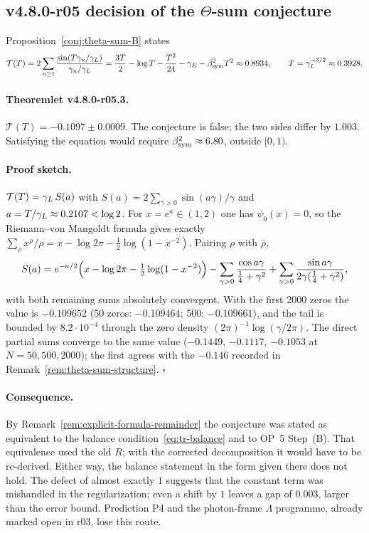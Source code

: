 \subsection*{v4.8.0-r05 decision of the \texorpdfstring{$\Theta$}{Theta}-sum conjecture}
\label{subsec:v480-r05-theta-sum-decision}

Proposition~\ref{conj:theta-sum-B} states
\[
\mathcal T(T)=2\sum_{n\ge1}\frac{\sin(T\gamma_n/\gamma_L)}{\gamma_n/\gamma_L}
=\frac{3T}{2}-\log T-\frac{T^2}{24}-\gamma_E-\beta_{\mathrm{sym}}^2T^2\approx0.8934,
\qquad T=\gamma_L^{-3/2}\approx0.3928 .
\]

\paragraph{Theoremlet v4.8.0-r05.3.}
\(\mathcal T(T)=-0.1097\pm0.0009\).  The conjecture is false; the two sides differ by \(1.003\).
Satisfying the equation would require \(\beta_{\mathrm{sym}}^2\approx6.80\), outside \([0,1)\).

\paragraph{Proof sketch.}
\(\mathcal T(T)=\gamma_L\,S(a)\) with \(S(a)=2\sum_{\gamma>0}\sin(a\gamma)/\gamma\) and
\(a=T/\gamma_L\approx0.2107<\log2\).  For \(x=e^a\in(1,2)\) one has \(\psi_0(x)=0\), so the
Riemann--von Mangoldt formula gives exactly
\(\sum_\rho x^\rho/\rho=x-\log2\pi-\tfrac12\log(1-x^{-2})\).  Pairing \(\rho\) with \(\bar\rho\),
\[
S(a)=e^{-a/2}\Bigl(x-\log2\pi-\tfrac12\log(1-x^{-2})\Bigr)
-\sum_{\gamma>0}\frac{\cos a\gamma}{\tfrac14+\gamma^2}
+\sum_{\gamma>0}\frac{\sin a\gamma}{2\gamma(\tfrac14+\gamma^2)},
\]
with both remaining sums absolutely convergent.  With the first 2000 zeros the value is
\(-0.109652\) (50 zeros: \(-0.109464\); 500: \(-0.109661\)), and the tail is bounded by
\(8.2\cdot10^{-4}\) through the zero density \((2\pi)^{-1}\log(\gamma/2\pi)\).  The direct partial sums
converge to the same value (\(-0.1449\), \(-0.1117\), \(-0.1053\) at \(N=50,500,2000\)); the
first agrees with the \(-0.146\) recorded in Remark~\ref{rem:theta-sum-structure}.  \(\square\)

\paragraph{Consequence.}
By Remark~\ref{rem:explicit-formula-remainder} the conjecture was stated as equivalent to the
balance condition~\eqref{eq:tr-balance} and to OP~5 Step~(B).  That equivalence used the old
\(R\); with the corrected decomposition it would have to be re-derived.  Either way, the balance
statement in the form given there does not hold.  The defect of almost exactly \(1\) suggests that
the constant term was mishandled in the regularization; even a shift by \(1\) leaves a gap of
\(0.003\), larger than the error bound.  Prediction P4 and the photon-frame \(\Lambda\) programme,
already marked open in r03, lose this route.

